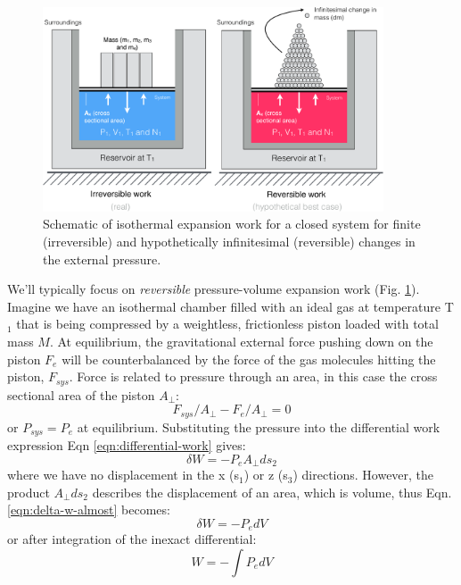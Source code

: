 \documentclass[11pt]{article}
\theoremstyle{definition}
\begin{document}
\begin{figure}[!ht]\centering
\includegraphics[width=0.90\textwidth]{./figs/WorkReversible.pdf}
\caption{Schematic of isothermal expansion work for a closed system for finite (irreversible) and hypothetically infinitesimal (reversible) changes in the external pressure.
}\label{fig-expansion-work-schematic}
\end{figure}

We'll typically focus on \textit{reversible} pressure-volume expansion work (Fig. \ref{fig-expansion-work-schematic}).
Imagine we have an isothermal chamber filled with an ideal gas at temperature T$_{1}$ that is being compressed by a weightless, frictionless piston loaded with total mass $M$.
At equilibrium, the gravitational external force pushing down on the piston $F_{e}$ will be counterbalanced by the force of the gas molecules hitting the piston, $F_{sys}$.
Force is related to pressure through an area, in this case the cross sectional area of the piston $A_{\perp}$:
\begin{equation}
F_{sys}/A_{\perp} - F_{e}/A_{\perp} = 0
\end{equation}or $P_{sys} = P_{e}$ at equilibrium.
Substituting the pressure into the differential work expression Eqn \eqref{eqn:differential-work} gives:
\begin{equation}\label{eqn:delta-w-almost}
\delta W = - P_{e}A_{\perp}ds_{2}
\end{equation}where we have no displacement in the x (s$_{1}$) or z (s$_{3}$) directions.
However, the product $A_{\perp}ds_{2}$ describes the displacement of an area, which is volume, thus Eqn. \eqref{eqn:delta-w-almost} becomes:
\begin{equation}
\delta W = - P_{e}dV
\end{equation}or after integration of the inexact differential:
\begin{equation}\label{eqn:work-equation}
W = - \int P_{e}dV
\end{equation}
\end{document}
